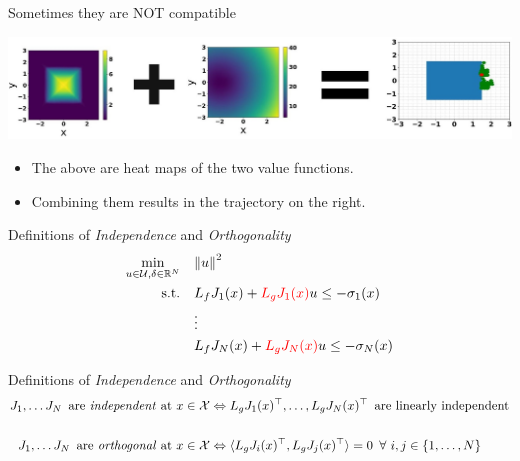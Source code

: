 \begin{frame}{Sometimes they are NOT compatible}
	\begin{minipage}{\textwidth}
		\centering		
		\includegraphics[width=1.\linewidth]{diagramMath}
	\end{minipage}%
	\seprule
	\begin{itemize}
		\item{The above are heat maps of the two value functions.}
		\item{Combining them results in the trajectory on the right.}
	\end{itemize}
\end{frame}

\begin{frame}{Definitions of \textit{Independence} and \textit{Orthogonality}}
	\begin{align*}
		\min_{u \in \mathcal{U}, \delta \in \mathbb{R}^N} \quad & { \lVert u \rVert }^2 \\
		\textrm{s.t.} \quad & L_f {J}_1 (x) + { \color{red} L_g {J}_1 (x) } u \le - \sigma_1(x) \\
                \quad & \vdots \\
		\quad & L_f {J}_N (x) + { \color{red} L_g {J}_N (x) } u \le - \sigma_N(x) \\
	\end{align*}
\end{frame}

\begin{frame}{Definitions of \textit{Independence} and \textit{Orthogonality}}
	\centering
	\begin{align*}
		{J}_1, \ldots {J}_N \,\,\, \textrm{are \textit{independent} at $x \in \mathcal{X}$} &\Leftrightarrow L_g {J}_1 (x)^{\top}, \ldots, L_g {J}_N (x)^{\top} \,\,\, \textrm{are linearly independent}\\
		\\
		{J}_1, \ldots {J}_N \,\,\, \textrm{are \textit{orthogonal} at $x \in \mathcal{X}$} &\Leftrightarrow \langle L_g {J}_i (x)^{\top}, L_g {J}_j (x)^{\top} \rangle = 0 \,\,\, \forall \,\, i, j \in \{1,\ldots,N \}
	\end{align*}
\end{frame}

